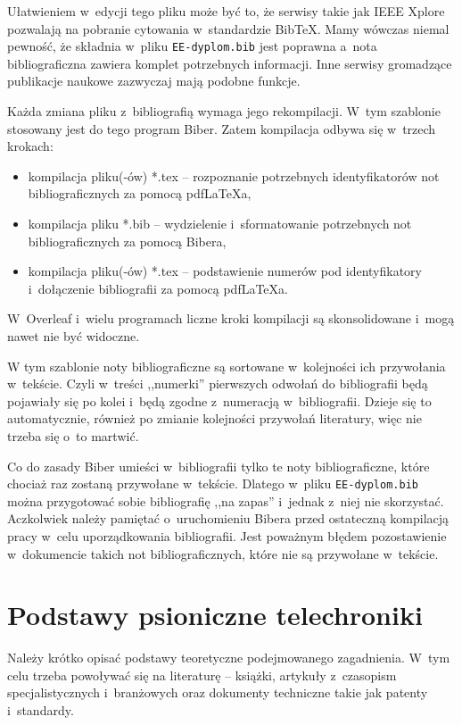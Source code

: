 Ułatwieniem w~edycji tego pliku może być to, że serwisy takie jak IEEE Xplore pozwalają na pobranie cytowania w~standardzie BibTeX. Mamy wówczas niemal pewność, że składnia w~pliku \texttt{EE-dyplom.bib} jest poprawna a~nota bibliograficzna zawiera komplet potrzebnych informacji. Inne serwisy gromadzące publikacje naukowe zazwyczaj mają podobne funkcje.

Każda zmiana pliku z~bibliografią wymaga jego rekompilacji. W~tym szablonie stosowany jest do tego program Biber. Zatem kompilacja odbywa się w~trzech krokach:
\begin{itemize}
	\item kompilacja pliku(-ów) *.tex -- rozpoznanie potrzebnych identyfikatorów not bibliograficznych za pomocą pdf\LaTeX{a},
	\item kompilacja pliku *.bib -- wydzielenie i~sformatowanie potrzebnych not bibliograficznych za pomocą Bibera,
	\item kompilacja pliku(-ów) *.tex -- podstawienie numerów pod identyfikatory i~dołączenie bibliografii za pomocą pdf\LaTeX{a}.
\end{itemize}
W~Overleaf i~wielu programach liczne kroki kompilacji są skonsolidowane i~mogą nawet nie być widoczne. 

W tym szablonie noty bibliograficzne są sortowane w~kolejności ich przywołania w~tekście. Czyli w~treści ,,numerki'' pierwszych odwołań do bibliografii będą pojawiały się po kolei i~będą zgodne z~numeracją w~bibliografii. Dzieje się to automatycznie, również po zmianie kolejności przywołań literatury, więc nie trzeba się o~to martwić.

Co do zasady Biber umieści w~bibliografii tylko te noty bibliograficzne, które chociaż raz zostaną przywołane w~tekście. Dlatego w~pliku \texttt{EE-dyplom.bib} można przygotować sobie bibliografię ,,na zapas'' i~jednak z~niej nie skorzystać. Aczkolwiek należy pamiętać o~uruchomieniu Bibera przed ostateczną kompilacją pracy w~celu uporządkowania bibliografii. Jest poważnym błędem pozostawienie w~dokumencie takich not bibliograficznych, które nie są przywołane w~tekście.

\section{Podstawy psioniczne telechroniki}

Należy krótko opisać podstawy teoretyczne podejmowanego zagadnienia. W~tym celu trzeba powoływać się na literaturę -- książki, artykuły z~czasopism specjalistycznych i~branżowych oraz dokumenty techniczne takie jak patenty i~standardy.

